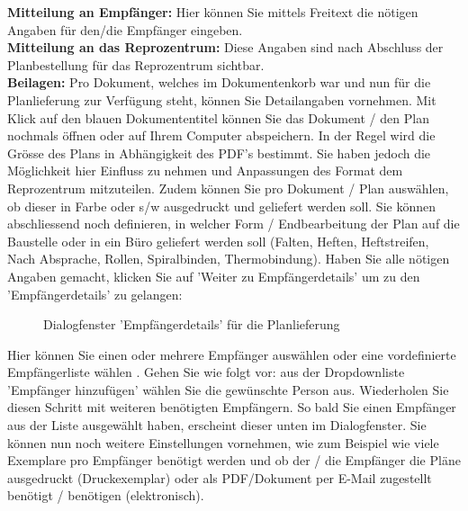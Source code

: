 \textbf{Mitteilung an Empfänger:} Hier können Sie mittels Freitext die nötigen Angaben für den/die Empfänger eingeben. \\
\textbf{Mitteilung an das Reprozentrum:} Diese Angaben sind nach Abschluss der Planbestellung für das Reprozentrum sichtbar. \\
\textbf{Beilagen:} Pro Dokument, welches im Dokumentenkorb war und nun für die Planlieferung zur Verfügung steht, können Sie Detailangaben vornehmen.   Mit Klick auf den blauen Dokumententitel können Sie das Dokument / den Plan nochmals öffnen oder auf Ihrem Computer abspeichern.
In der Regel wird die Grösse des Plans in Abhängigkeit des PDF's bestimmt. Sie haben jedoch die Möglichkeit hier Einfluss zu nehmen und Anpassungen des Format dem Reprozentrum mitzuteilen. Zudem können Sie pro Dokument / Plan auswählen, ob dieser in Farbe oder s/w ausgedruckt und geliefert werden soll. Sie können abschliessend noch definieren, in welcher Form / Endbearbeitung der Plan auf die Baustelle oder in ein Büro geliefert werden soll (Falten, Heften, Heftstreifen, Nach Absprache, Rollen, Spiralbinden, Thermobindung).
Haben Sie alle nötigen Angaben gemacht, klicken Sie auf 'Weiter zu Empfängerdetails' um zu den 'Empfängerdetails' zu gelangen:

\begin{figure}[H]
\caption{Dialogfenster 'Empfängerdetails' für die Planlieferung}
\end{figure}

Hier können Sie einen oder mehrere Empfänger auswählen  oder eine vordefinierte Empfängerliste wählen . Gehen Sie wie folgt vor: aus der Dropdownliste 'Empfänger hinzufügen' wählen Sie die gewünschte Person aus. Wiederholen Sie diesen Schritt mit weiteren benötigten Empfängern. So bald Sie einen Empfänger aus der Liste ausgewählt haben, erscheint dieser unten im Dialogfenster. Sie können nun noch weitere Einstellungen vornehmen, wie zum Beispiel wie viele Exemplare pro Empfänger benötigt werden und ob der / die Empfänger die Pläne ausgedruckt (Druckexemplar) oder als PDF/Dokument per E-Mail zugestellt benötigt / benötigen (elektronisch). \\

